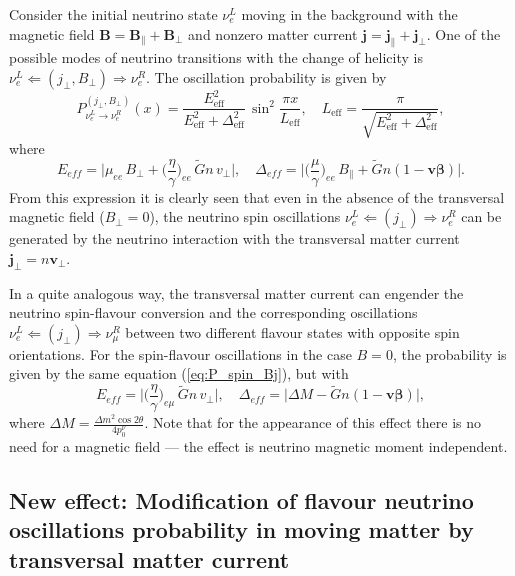 \documentclass[a4paper,11pt]{article}
\begin{document}
Consider the initial neutrino state $\nu_e^L$ moving in the background with the magnetic field $\mathbf{B} = \mathbf{B}_\parallel + \mathbf{B}_\perp$ and nonzero matter current $\mathbf{j} = \mathbf{j}_\parallel + \mathbf{j}_\perp$. One of the possible modes of neutrino transitions with the change of helicity is $\nu_e^L \Leftarrow (j_\perp, B_\perp) \Rightarrow \nu_e^R$. The oscillation probability is given by~\cite{Studenikin:2019arXiv}
\begin{equation}
\label{eq:P_spin_Bj}
P_{\nu_e^L \to \nu_e^R}^{(j_\perp, B_\perp)}(x) = \frac{E_{\text{eff}}^2}{E_{\text{eff}}^2 + \Delta_{\text{eff}}^2}\,\sin^2\frac{\pi x}{L_{\text{eff}}}, \quad L_{\text{eff}} = \frac{\pi}{\sqrt{E_{\text{eff}}^2 + \Delta_{\text{eff}}^2}},
\end{equation}
where
\begin{equation}
E_{eff} = \Big|\mu_{ee}\,B_\perp + \Big(\frac{\eta}{\gamma}\Big)_{ee}\,\tilde{G}n\,v_\perp\Big|, \quad \Delta_{eff} = \Big|\Big(\frac{\mu}{\gamma}\Big)_{ee}\,B_\parallel + \tilde{G}n(1-\mathbf{v}\boldsymbol{\beta})\Big|.
\end{equation}
From this expression it is clearly seen that even in the absence of the transversal magnetic field ($B_\perp = 0$), the neutrino spin oscillations $\nu_e^L \Leftarrow (j_\perp) \Rightarrow \nu_e^R$ can be generated by the neutrino interaction with the transversal matter current $\mathbf{j}_\perp = n\mathbf{v}_\perp$.

In a quite analogous way, the transversal matter current can engender the neutrino spin-flavour conversion and the corresponding oscillations $\nu_e^L \Leftarrow (j_\perp) \Rightarrow \nu_\mu^R$ between two different flavour states with opposite spin orientations. For the spin-flavour oscillations in the case $B = 0$, the probability is given by the same equation (\ref{eq:P_spin_Bj}), but with~\cite{Studenikin:2019arXiv}
\begin{equation}
E_{eff} = \Big|\Big(\frac{\eta}{\gamma}\Big)_{e\mu}\,\tilde{G}n\,v_\perp\Big|, \quad \Delta_{eff} = \Big|\Delta M - \tilde{G}n(1-\mathbf{v}\boldsymbol{\beta})\Big|,
\end{equation}
where $\Delta M = \frac{\Delta m^2\cos 2\theta}{4p_0^\nu}$. Note that for the appearance of this effect there is no need for a magnetic field --- the effect is neutrino magnetic moment independent.

\subsection{New effect: Modification of flavour neutrino oscillations probability in moving matter by transversal matter current}
\end{document}
